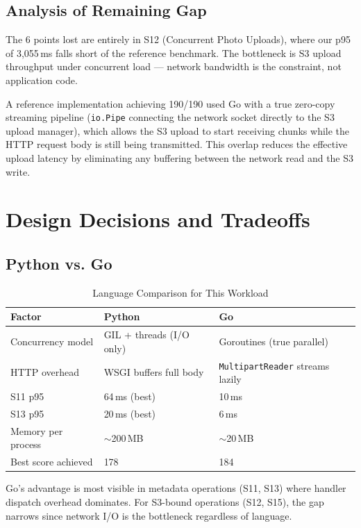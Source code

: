 \documentclass[11pt]{article}
\begin{document}
\subsection{Analysis of Remaining Gap}

The 6 points lost are entirely in S12 (Concurrent Photo Uploads), where our p95 of 3,055\,ms falls short of the reference benchmark. The bottleneck is S3 upload throughput under concurrent load --- network bandwidth is the constraint, not application code.

A reference implementation achieving 190/190 used Go with a true zero-copy streaming pipeline (\texttt{io.Pipe} connecting the network socket directly to the S3 upload manager), which allows the S3 upload to start receiving chunks while the HTTP request body is still being transmitted. This overlap reduces the effective upload latency by eliminating any buffering between the network read and the S3 write.

\section{Design Decisions and Tradeoffs}

\subsection{Python vs. Go}

\begin{table}[H]
\centering
\caption{Language Comparison for This Workload}
\begin{tabular}{lll}
\toprule
\textbf{Factor} & \textbf{Python} & \textbf{Go} \\
\midrule
Concurrency model & GIL + threads (I/O only) & Goroutines (true parallel) \\
HTTP overhead & WSGI buffers full body & \texttt{MultipartReader} streams lazily \\
S11 p95 & 64\,ms (best) & 10\,ms \\
S13 p95 & 20\,ms (best) & 6\,ms \\
Memory per process & $\sim$200\,MB & $\sim$20\,MB \\
Best score achieved & 178 & 184 \\
\bottomrule
\end{tabular}
\end{table}

Go's advantage is most visible in metadata operations (S11, S13) where handler dispatch overhead dominates. For S3-bound operations (S12, S15), the gap narrows since network I/O is the bottleneck regardless of language.
\end{document}
